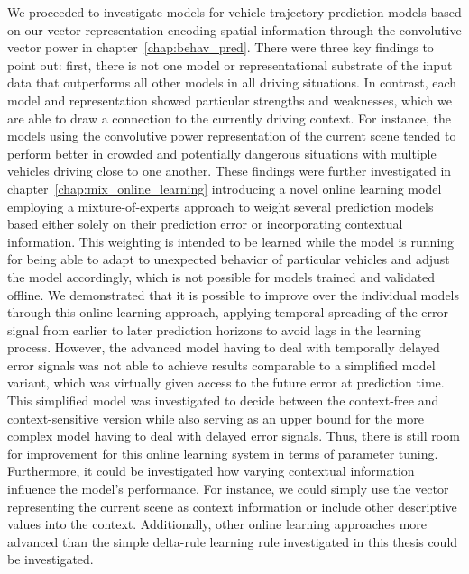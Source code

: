 We proceeded to investigate models for vehicle trajectory prediction models based on our vector representation encoding spatial information through the convolutive vector power in chapter~\ref{chap:behav_pred}.
There were three key findings to point out: first, there is not one model or representational substrate of the input data that outperforms all other models in all driving situations.
In contrast, each model and representation showed particular strengths and weaknesses, which we are able to draw a connection to the currently driving context.
For instance, the models using the convolutive power representation of the current scene tended to perform better in crowded and potentially dangerous situations with multiple vehicles driving close to one another.
These findings were further investigated in chapter~\ref{chap:mix_online_learning} introducing a novel online learning model employing a mixture-of-experts approach to weight several prediction models based either solely on their prediction error or incorporating contextual information.
This weighting is intended to be learned while the model is running for being able to adapt to unexpected behavior of particular vehicles and adjust the model accordingly, which is not possible for models trained and validated offline.
We demonstrated that it is possible to improve over the individual models through this online learning approach, applying temporal spreading of the error signal from earlier to later prediction horizons to avoid lags in the learning process.
However, the advanced model having to deal with temporally delayed error signals was not able to achieve results comparable to a simplified model variant, which was virtually given access to the future error at prediction time.
This simplified model was investigated to decide between the context-free and context-sensitive version while also serving as an upper bound for the more complex model having to deal with delayed error signals.
Thus, there is still room for improvement for this online learning system in terms of parameter tuning.
Furthermore, it could be investigated how varying contextual information influence the model's performance.
For instance, we could simply use the vector representing the current scene as context information or include other descriptive values into the context.
Additionally, other online learning approaches more advanced than the simple delta-rule learning rule investigated in this thesis could be investigated.

